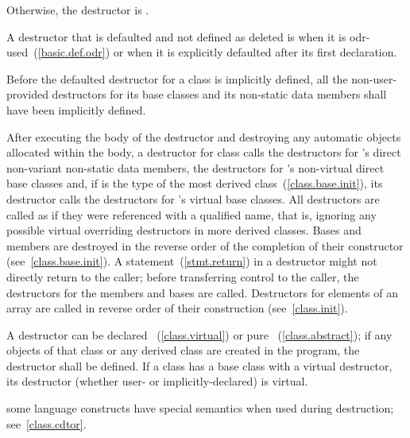 Otherwise, the destructor is
.

\pnum
{}%
A destructor
that is defaulted and not defined as deleted
is
when it is odr-used~(\ref{basic.def.odr})
or when it is explicitly defaulted after its first declaration.

\pnum
Before the
defaulted destructor for a class is implicitly defined, all the non-user-provided
destructors for its base classes and its non-static data members shall have been
implicitly defined.

\pnum
{}%
%
%
After executing the body of the destructor and destroying
any automatic objects allocated within the body, a
destructor for class
calls the destructors for
's
direct non-variant non-static data members, the destructors for
's
non-virtual direct base classes and, if
is the type of the most derived class~(\ref{class.base.init}),
its destructor calls the destructors for
's
virtual base classes.
All destructors are called as if they were referenced with a qualified name,
that is, ignoring any possible virtual overriding destructors in more
derived classes.
Bases and members are destroyed in the reverse order of the completion of
their constructor (see~\ref{class.base.init}).
A
statement~(\ref{stmt.return}) in a destructor might not directly return to the
caller; before transferring control to the caller, the destructors for the
members and bases are called.
%
Destructors for elements of an array are called in reverse order of their
construction (see~\ref{class.init}).

\pnum
{}%
%
A destructor can be declared
~(\ref{class.virtual})
or pure
~(\ref{class.abstract});
if any objects of that class or any derived class are created in the program,
the destructor shall be defined.
If a class has a base class with a virtual destructor, its  destructor
(whether user- or implicitly-declared) is virtual.

\pnum
\begin{note}
%
some language constructs have special semantics when used during destruction;
see~\ref{class.cdtor}.
\end{note}

